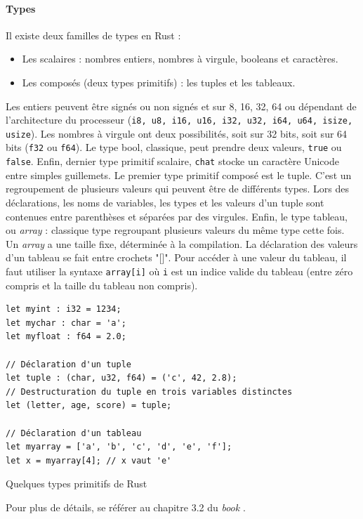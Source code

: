\documentclass[a4paper, 12pt]{article}
\newenvironment{code}{\captionsetup{type=listing}}{}
\begin{document}
\paragraph{Types}
Il existe deux familles de types en Rust : 
\begin{itemize}
    \item Les scalaires : nombres entiers, nombres à virgule, booleans et caractères.
    \item Les composés (deux types primitifs) : les tuples et les tableaux.
\end{itemize}
Les entiers peuvent être signés ou non signés et sur 8, 16, 32, 64 ou dépendant de l'architecture
du processeur (\texttt{i8, u8, i16, u16, i32, u32, i64, u64, isize, usize}). Les nombres 
à virgule ont deux possibilités, soit sur 32 bits, soit sur 64 bits (\texttt{f32} ou 
\texttt{f64}). Le type bool, classique, peut prendre deux valeurs, \texttt{true} 
ou \texttt{false}. Enfin, dernier type primitif scalaire, \texttt{chat} stocke 
un caractère Unicode entre simples guillemets. Le premier type primitif composé est le tuple. C'est 
un regroupement de plusieurs valeurs qui peuvent être de différents types. Lors des déclarations, 
les noms de variables, les types et les valeurs d'un tuple sont contenues entre parenthèses et 
séparées par des virgules. Enfin, le type tableau, ou \textit{array} : classique type regroupant 
plusieurs valeurs du même type cette fois. Un \textit{array} a une taille fixe, déterminée à la 
compilation. La déclaration des valeurs d'un tableau se fait entre crochets "[]". Pour accéder à une 
valeur du tableau, il faut utiliser la syntaxe \texttt{array[i]} où \texttt{i} 
est un indice valide du tableau (entre zéro compris et la taille du tableau non compris).
\bigbreak
\begin{code}
    \begin{verbatim}
let myint : i32 = 1234;
let mychar : char = 'a';
let myfloat : f64 = 2.0;

// Déclaration d'un tuple
let tuple : (char, u32, f64) = ('c', 42, 2.8);
// Destructuration du tuple en trois variables distinctes
let (letter, age, score) = tuple;

// Déclaration d'un tableau
let myarray = ['a', 'b', 'c', 'd', 'e', 'f'];
let x = myarray[4]; // x vaut 'e'
    \end{verbatim}
    \caption{Quelques types primitifs de Rust}
    \label{rust_types}
\end{code}
\bigbreak
Pour plus de détails, se référer au chapitre 3.2 du \textit{book} \cite{ref0}.
\end{document}
